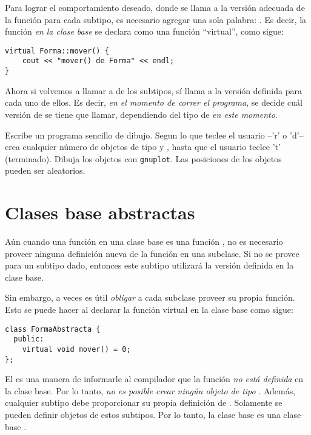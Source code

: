 Para lograr el comportamiento deseado, donde se llama a la versión adecuada de la función  para cada subtipo, es necesario agregar una sola palabra: . Es decir, la función  \emph{en la clase base} se declara como una función ``virtual'', como sigue:
\begin{lstlisting}
virtual Forma::mover() {
	cout << "mover() de Forma" << endl;
}
\end{lstlisting}

Ahora si volvemos a llamar a  de los subtipos, sí llama a la versión definida para cada uno de ellos.
Es decir, \emph{en el momento de correr el programa}, se decide cuál versión de  se tiene que llamar, dependiendo del tipo de  \emph{en este momento}. 

\ejercicio
Escribe un programa sencillo de dibujo.
Segun lo que teclee el usuario --'r' o 'd'-- crea cualquier número de objetos de tipo  y , hasta que el usuario teclee
't' (terminado). Dibuja los objetos con \texttt{gnuplot}.  Las posiciones de los objetos pueden ser aleatorios.

\section{Clases base abstractas}
Aún cuando una función en una clase base es una función , no es necesario proveer ninguna definición nueva de la función en una subclase. Si no se provee para un subtipo dado, entonces este subtipo utilizará la versión definida en la clase base.

Sin embargo, a veces es útil \emph{obligar} a cada subclase proveer su propia función. 
Esto se puede hacer al declarar la función virtual en la clase base como sigue:
\begin{lstlisting}
class FormaAbstracta {
  public:
	virtual void mover() = 0;
};
\end{lstlisting}
El  es una manera de informarle al compilador que la función  \emph{no está definida} en la clase base.
Por lo tanto, \emph{no es posible crear ningún objeto de tipo }. Además, cualquier subtipo debe proporcionar su propia definición de . Solamente se pueden definir objetos de estos subtipos.
Por lo tanto, la clase base es una clase base .



